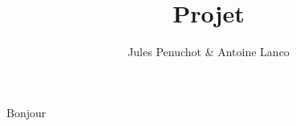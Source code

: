 \documentclass{article}
\title{Projet}
\author{Jules Penuchot & Antoine Lanco}
\begin{document}
\maketitle
Bonjour
\end{document}
